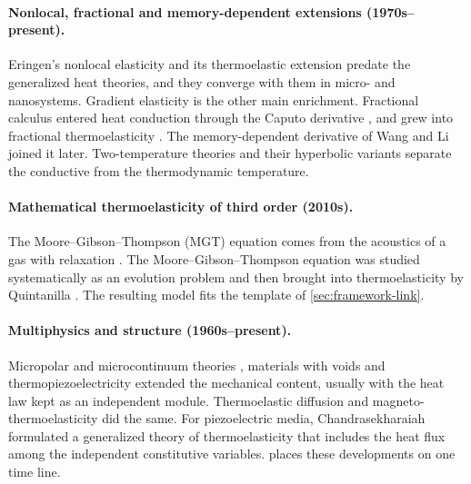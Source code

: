 \paragraph{Nonlocal, fractional and memory-dependent extensions (1970s--present).} Eringen's nonlocal elasticity \citep{Eringen1972,Eringen1983,Eringen2002} and its thermoelastic extension \citep{Eringen1974} predate the generalized heat theories, and they converge with them in micro- and nanosystems. Gradient elasticity \citep{Aifantis1992,Aifantis2003,Askes2006,Askes2011} is the other main enrichment. Fractional calculus entered heat conduction through the Caputo derivative \citep{Caputo1967}, and grew into fractional thermoelasticity \citep{Povstenko2004,Povstenko2007,Povstenko2009,Povstenko2011Cattaneo,Povstenko2016,Sherief2010Fractional,Ezzat2011}. The memory-dependent derivative of Wang and Li \citep{Wang2011,Wang2021} joined it later. Two-temperature theories \citep{ChenGurtin1968,Youssef2006} and their hyperbolic variants \citep{Prasad2020,Alzahrani2020,Bassiouny2020} separate the conductive from the thermodynamic temperature.

\paragraph{Mathematical thermoelasticity of third order (2010s).} The Moore--Gibson--Thompson (MGT) equation comes from the acoustics of a gas with relaxation \citep{MooreGibson1960}. The Moore--Gibson--Thompson equation was studied systematically as an evolution problem \citep{MarchandMcDevittTriggiani2012,LasieckaWang2015MGT,DellOroLasieckaPata2016MGT,DellOroPata2016Viscoelasticity} and then brought into thermoelasticity by Quintanilla \citep{Quintanilla2019,Bazarra2021MGTradial}. The resulting model fits the template of \cref{sec:framework-link}.

\paragraph{Multiphysics and structure (1960s--present).} Micropolar and microcontinuum theories \citep{Eringen1966a,TauchertClausAriman1968,Eringen1999}, materials with voids \citep{Nunziato1979,Cowin1983,Iesan1986} and thermopiezoelectricity \citep{Mindlin1974Thermopiezo,Nowacki1978,Chandrasekharaiah1984} extended the mechanical content, usually with the heat law kept as an independent module. Thermoelastic diffusion and magneto-thermoelasticity did the same. For piezoelectric media, Chandrasekharaiah \citep{Chandrasekharaiah1988} formulated a generalized theory of thermoelasticity that includes the heat flux among the independent constitutive variables.  places these developments on one time line.

